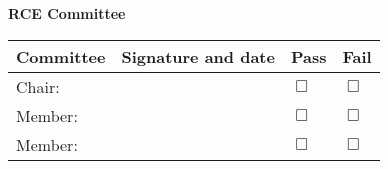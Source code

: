 \documentclass{article}
\begin{document}
\noindent {} 
\vspace{3em}

\noindent\textbf{RCE Committee}
\vspace{1em}

\renewcommand{\arraystretch}{1.5}
\noindent\begin{tabular}{|p{5cm}|p{5cm}|p{1cm}|p{1cm}|}
    \hline
    \textbf{Committee} & \textbf{Signature and date } & \textbf{Pass} & \textbf{Fail} \\
    \hline
    Chair: & {} & $\Box$ & $\Box$ \\
    \hline
    Member: & {} & $\Box$ & $\Box$ \\
    \hline
    Member: & {} & $\Box$ & $\Box$ \\
    \hline
\end{tabular}
\end{document}
